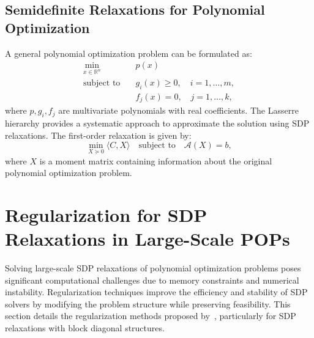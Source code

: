 \documentclass[12pt]{l4dc2021}
\begin{document}
    \subsection{Semidefinite Relaxations for Polynomial Optimization}
        A general polynomial optimization problem can be formulated as:
        \begin{align} \label{eq:pop_eq} 
            \min_{x \in \mathbb{R}^n} \quad & p(x)  \nonumber\\
            \text{subject to} \quad & g_i(x) \geq 0, \quad i = 1, \dots, m, \\
            & f_j(x) = 0, \quad j = 1, \dots, k, \nonumber 
        \end{align} 
        where \( p, g_i, f_j \) are multivariate polynomials with real coefficients. The Lasserre hierarchy provides a systematic approach to approximate the solution using SDP relaxations. The first-order relaxation is given by:
        \begin{equation} \label{eq:pop_sdp_eq}
            \min_{X \succeq 0} \langle C, X \rangle \quad \text{subject to} \quad \mathcal{A}(X) = b,
        \end{equation}
        where \( X \) is a moment matrix containing information about the original polynomial optimization problem.

\section{Regularization for SDP Relaxations in Large-Scale POPs}  \label{sec:regularization}
    Solving large-scale SDP relaxations of polynomial optimization problems poses significant computational challenges due to memory constraints and numerical instability. Regularization techniques improve the efficiency and stability of SDP solvers by modifying the problem structure while preserving feasibility. This section details the regularization methods proposed by~\cite{nie2012regularization}, particularly for SDP relaxations with block diagonal structures.
\end{document}
